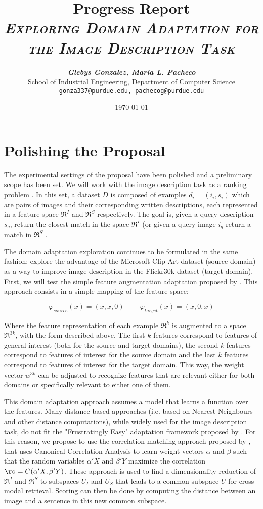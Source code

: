 \documentclass[11pt]{article}
\title{
\textbf{Progress Report} \\ \textsc{\textit{Exploring Domain Adaptation for the Image Description Task}} \\
}
\author{
	\textbf{\textit{Glebys Gonzalez, Maria L. Pacheco}} \\
	School of Industrial Engineering, Department of Computer Science\\
	\texttt{gonza337@purdue.edu, pachecog@purdue.edu}
}
\date{\today}
\begin{document}
\maketitle



\section{Polishing the Proposal}

The experimental settings of the proposal have been polished and a preliminary scope has been set. We will work with the image description task as a ranking problem \cite{Hodosh:2013:FID:2566972.2566993}. In this set, a dataset  $D$ is composed of examples $d_{i} = (i_{i}, s_{i})$ which are pairs of images and their corresponding written descriptions, each represented in a feature space $\Re^{I}$ and $\Re^{S}$ respectively. The goal is, given a query description $s_q$, return the closest match in the space $\Re^{I}$ (or given a query image $i_q$ return a match in $\Re^{S}$ \cite{rasiwasia2010new}.

The domain adaptation exploration continues to be formulated in the same fashion: explore the advantage of the Microsoft Clip-Art dataset \cite{6751319} \cite{Zitnick_2013_ICCV_Workshops} (source domain) as a way to improve image description in the Flickr30k dataset \cite{} (target domain). First, we will test the simple feature augmentation adaptation proposed by \cite{daumeiii:2007:ACLMain}. This approach consists in a simple mapping of the feature space:

$$\varphi_{source}(x) = (x,x,0) \;\;\;\;\;\;\;\; \varphi_{target}(x) = (x,0,x)$$

Where the feature representation of each example $\Re^{k}$ is augmented to a space $\Re^{3k}$, with the form described above. The first $k$ features correspond to features of general interest (both for the source and target domains), the second $k$ features correspond to features of interest for the source domain and the last $k$ features correspond to features of interest for the target domain. This way, the weight vector $w^{3k}$ can be adjusted to recognize features that are relevant either for both domains or specifically relevant to either one of them.

This domain adaptation approach assumes a model that learns a function over the features. Many distance based approaches (i.e. based on Nearest Neighbours and other distance computations), while widely used for the image description task, do not fit the "Frustratingly Easy" adaptation framework proposed by \cite{daumeiii:2007:ACLMain}. For this reason, we propose to use the correlation matching approach proposed by \cite{rasiwasia2010new}, that uses Canonical Correlation Analysis to learn weight vectors $\alpha$ and $\beta$ such that the random variables $\alpha'X$ and $\beta'Y$ maximize the correlation $\ro = C(\alpha'X, \beta'Y)$. These approach is used to find a dimensionality reduction of $\Re^{I}$ and $\Re^{S}$ to subspaces $U_{I}$ and $U_{S}$ that leads to a common subspace $U$ for cross-modal retrieval. Scoring can then be done by computing the distance between an image and a sentence in this new common subspace. 
\end{document}
